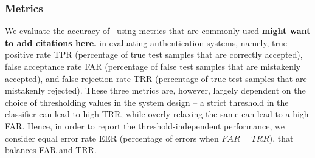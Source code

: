 \subsubsection{Metrics}
We evaluate the accuracy of \systemname~using metrics that are commonly used \textbf{might want to add citations here.}
in evaluating authentication systems, namely,
true positive rate TPR (percentage of true test samples that are
correctly accepted), false acceptance rate FAR (percentage of false test samples that are
mistakenly accepted), and false rejection rate TRR (percentage of true test
samples that are mistakenly rejected). These three metrics are, however, largely dependent on the choice of thresholding values in the system design --
a strict threshold in the classifier can lead to high TRR, while
overly relaxing the same can lead to a high FAR. Hence, in order to report the threshold-independent performance, we consider equal error rate EER (percentage of errors when $FAR = TRR$), that
balances FAR and TRR.



